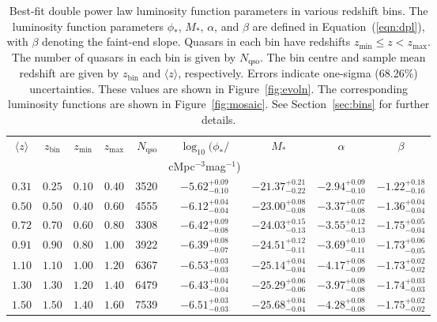 \documentclass[a4paper,fleqn,usenatbib]{mnras}
\begin{document}
\begin{table*}
  \caption{Best-fit double power law luminosity function parameters in
    various redshift bins.  The luminosity function parameters
    $\phi_*$, $M_*$, $\alpha$, and $\beta$ are defined in
    Equation~(\ref{eqn:dpl}), with $\beta$ denoting the faint-end
    slope.  Quasars in each bin have redshifts $z_\mathrm{min}\leq z <
    z_\mathrm{max}$.  The number of quasars in each bin is given by
    $N_\mathrm{qso}$.  The bin centre and sample mean redshift are
    given by $z_\mathrm{bin}$ and $\langle z\rangle$, respectively.
    Errors indicate one-sigma (68.26\%) uncertainties.  These values
    are shown in Figure~\ref{fig:evoln}.  The corresponding luminosity
    functions are shown in Figure~\ref{fig:mosaic}.  See
    Section~\ref{sec:bins} for further details.}
  \label{tab:bins}
  \begin{tabular}{ccccrcccc}
    \hline
    $\langle z\rangle$ & $z_\mathrm{bin}$ & $z_\mathrm{min}$ & $z_\mathrm{max}$ & $N_\mathrm{qso}$ & $\log_{10}(\phi_*/$ & $M_*$ & $\alpha$ & $\beta$ \\
    & & & & & cMpc$^{-3}$mag$^{-1}$) & & & \\
    \hline
    $0.31$ & $0.25$ & $0.10$ & $0.40$ & 3520 & $-5.62^{+0.09}_{-0.10}$ & $-21.37^{+0.21}_{-0.22}$ & $-2.94^{+0.09}_{-0.10}$ & $-1.22^{+0.18}_{-0.16}$ \\
    $0.50$ & $0.50$ & $0.40$ & $0.60$ & 4555 & $-6.12^{+0.04}_{-0.04}$ & $-23.00^{+0.08}_{-0.08}$ & $-3.37^{+0.07}_{-0.08}$ & $-1.36^{+0.04}_{-0.04}$ \\
    $0.72$ & $0.70$ & $0.60$ & $0.80$ & 3308 & $-6.42^{+0.09}_{-0.08}$ & $-24.03^{+0.15}_{-0.13}$ & $-3.55^{+0.12}_{-0.13}$ & $-1.75^{+0.05}_{-0.04}$ \\
    $0.91$ & $0.90$ & $0.80$ & $1.00$ & 3922 & $-6.39^{+0.08}_{-0.07}$ & $-24.51^{+0.12}_{-0.11}$ & $-3.69^{+0.10}_{-0.11}$ & $-1.73^{+0.06}_{-0.05}$ \\
    $1.10$ & $1.10$ & $1.00$ & $1.20$ & 6367 & $-6.53^{+0.03}_{-0.03}$ & $-25.14^{+0.04}_{-0.04}$ & $-4.17^{+0.08}_{-0.09}$ & $-1.73^{+0.02}_{-0.02}$ \\
    $1.30$ & $1.30$ & $1.20$ & $1.40$ & 6479 & $-6.43^{+0.04}_{-0.04}$ & $-25.29^{+0.06}_{-0.06}$ & $-3.97^{+0.08}_{-0.08}$ & $-1.74^{+0.03}_{-0.03}$ \\
    $1.50$ & $1.50$ & $1.40$ & $1.60$ & 7539 & $-6.51^{+0.03}_{-0.03}$ & $-25.68^{+0.04}_{-0.04}$ & $-4.28^{+0.08}_{-0.08}$ & $-1.75^{+0.02}_{-0.02}$ \\

\end{tabular}
\end{table*}
\end{document}
